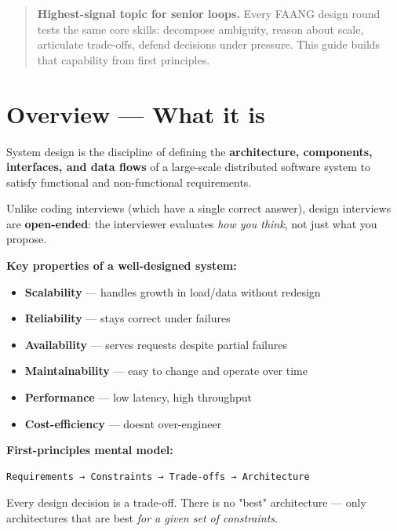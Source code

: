 \documentclass[11pt]{article}
\providecommand{\tightlist}{\setlength{\itemsep}{1pt}\setlength{\parskip}{0pt}}
\begin{document}
\makecoverpage

\thispagestyle{empty}
{\hypersetup{hidelinks}\tableofcontents}
\clearpage

\begin{quote}
\textbf{Highest-signal topic for senior loops.} Every FAANG design round tests the same core skills:
decompose ambiguity, reason about scale, articulate trade-offs, defend decisions under pressure.
This guide builds that capability from first principles.
\end{quote}

\section{Overview --- What it is}\label{overview--what-it-is}

System design is the discipline of defining the \textbf{architecture, components, interfaces, and data flows} of a large-scale distributed software system to satisfy functional and non-functional requirements.

Unlike coding interviews (which have a single correct answer), design interviews are \textbf{open-ended}: the interviewer evaluates \emph{how you think}, not just what you propose.

\textbf{Key properties of a well-designed system:}

\begin{itemize}
\tightlist
\item
  \textbf{Scalability} --- handles growth in load/data without redesign
\item
  \textbf{Reliability} --- stays correct under failures
\item
  \textbf{Availability} --- serves requests despite partial failures
\item
  \textbf{Maintainability} --- easy to change and operate over time
\item
  \textbf{Performance} --- low latency, high throughput
\item
  \textbf{Cost-efficiency} --- doesn\textquotesingle t over-engineer
\end{itemize}

\textbf{First-principles mental model:}

\setcodelang{}

\begin{verbatim}
Requirements → Constraints → Trade-offs → Architecture
\end{verbatim}

Every design decision is a trade-off. There is no "best" architecture --- only architectures that are best \emph{for a given set of constraints}.
\end{document}

